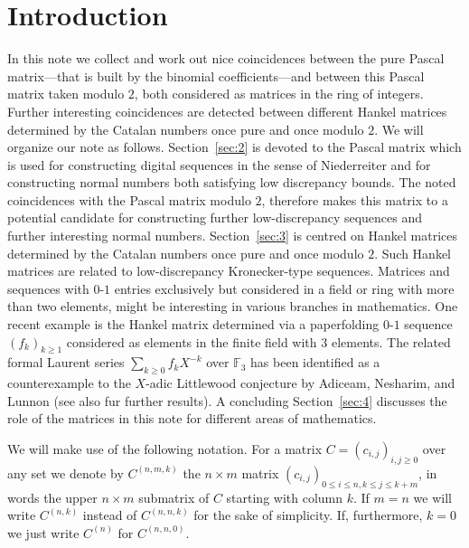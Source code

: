 \documentclass{article}
\newcommand{\FF}{\mathbb F}
\begin{document}
\section{Introduction}
In this note we collect and work out nice coincidences between the pure Pascal matrix---that is built by the binomial coefficients---and between this Pascal matrix taken modulo $2$, both considered as matrices in the ring of integers. Further interesting coincidences are detected between different Hankel matrices determined by the Catalan numbers once pure and once modulo $2$. We will organize our note as follows. 
Section~\ref{sec:2} is devoted to the Pascal matrix which is used for constructing digital sequences in the sense of Niederreiter and for constructing normal numbers both satisfying low discrepancy bounds. The noted coincidences with the Pascal matrix modulo $2$, therefore makes this matrix to a potential candidate for constructing further low-discrepancy sequences and further interesting normal numbers. 
Section~\ref{sec:3} is centred on Hankel matrices determined by the Catalan numbers once pure and once modulo $2$. Such Hankel matrices are related to low-discrepancy Kronecker-type sequences. %
Matrices and sequences with $0$-$1$ entries exclusively but considered in a field or ring with more than two elements, might be interesting in various branches in mathematics. One recent example is the Hankel matrix determined via a paperfolding $0$-$1$ sequence $(f_k)_{k\geq 1}$ considered as elements in the finite field with $3$ elements. The related formal Laurent series $\sum_{k\geq 0} f_kX^{-k}$ over $\FF_3$ has been identified as a counterexample to the $X$-adic Littlewood conjecture by Adiceam, Nesharim, and Lunnon \cite{ANL} (see also \cite{GR} fur further results). %
A concluding Section~\ref{sec:4} discusses the role of the matrices in this note for different areas of mathematics. 

We will make use of the following notation. For a matrix $C=(c_{i,j})_{i,j\geq 0}$ over any set we denote by $C^{(n,m,k)}$ the $n\times m$ matrix $(c_{i,j})_{0\leq i\leq n, k\leq j\leq k+m}$, in words the upper $n\times m$ submatrix of $C$ starting with column $k$. If $m=n$ we will write $C^{(n,k)}$ instead of $C^{(n,n,k)}$ for the sake of simplicity. If, furthermore, $k=0$ we just write $C^{(n)}$ for $C^{(n,n,0)}$. 
\end{document}
